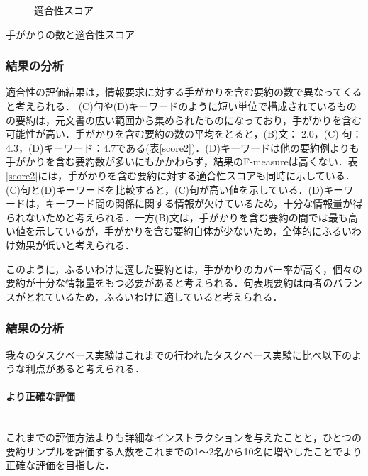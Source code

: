 \begin{figure}[htbp]
  \begin{center}
    \caption{適合性スコア}
    \label{scoregraph}
  \end{center}
\end{figure}

\vspace{-2em}
\begin{table}[htbp]
  \begin{center}
    \caption{手がかりの数と適合性スコア}
    \label{score2}
  \end{center}
\end{table}

\vspace{-2em}
\subsubsection{結果の分析}
適合性の評価結果は，情報要求に対する手がかりを含む要約の数で異なってくると考えられる． (C)句や(D)キーワードのように短い単位で構成されているものの要約は，元文書の広い範囲から集められたものになっており，手がかりを含む可能性が高い．手がかりを含む要約の数の平均をとると，(B)文： 2.0，(C) 句：4.3，(D)キーワード：4.7である(表\ref{score2})．(D)キーワードは他の要約例よりも手がかりを含む要約数が多いにもかかわらず，結果のF-measureは高くない．表\ref{score2}には，手がかりを含む要約に対する適合性スコアも同時に示している．(C)句と(D)キーワードを比較すると，(C)句が高い値を示している．(D)キーワードは，キーワード間の関係に関する情報が欠けているため，十分な情報量が得られないためと考えられる．一方(B)文は，手がかりを含む要約の間では最も高い値を示しているが，手がかりを含む要約自体が少ないため，全体的にふるいわけ効果が低いと考えられる．


このように，ふるいわけに適した要約とは，手がかりのカバー率が高く，個々の要約が十分な情報量をもつ必要があると考えられる．句表現要約は両者のバランスがとれているため，ふるいわけに適していると考えられる．

\subsubsection{結果の分析}
我々のタスクベース実験はこれまでの行われたタスクベース実験に比べ以下のような利点があると考えられる．

\paragraph{より正確な評価} ~ \\
\indent
これまでの評価方法よりも詳細なインストラクションを与えたことと，ひとつの要約サンプルを評価する人数をこれまでの1〜2名から10名に増やしたことでより正確な評価を目指した．

